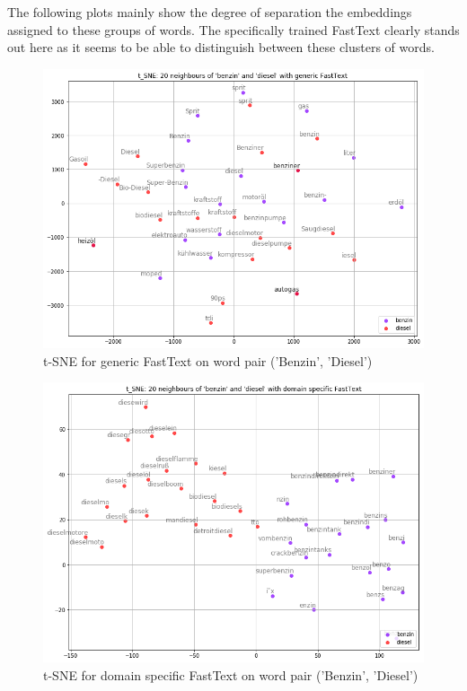 \documentclass[10pt,a4paper]{article}
\begin{document}
	The following plots mainly show the degree of separation the embeddings assigned to these groups of words. The specifically trained FastText clearly stands out here as it seems to be able to distinguish between these clusters of words. 
\begin{figure}
	\begin{center}
		\includegraphics[scale=0.4]{./Pictures/model_ft_benzin_diesel.png}
		
		\caption{t-SNE for generic FastText on word pair ('Benzin', 'Diesel')}
	\end{center}
\end{figure}
	
\begin{figure}
	\begin{center}
	\includegraphics[scale=0.4]{./Pictures/model_ds_ft_benzin_diesel.png}
	
	\caption{t-SNE for domain specific FastText on word pair ('Benzin', 'Diesel')}
\end{center}
\end{figure}
\end{document}
